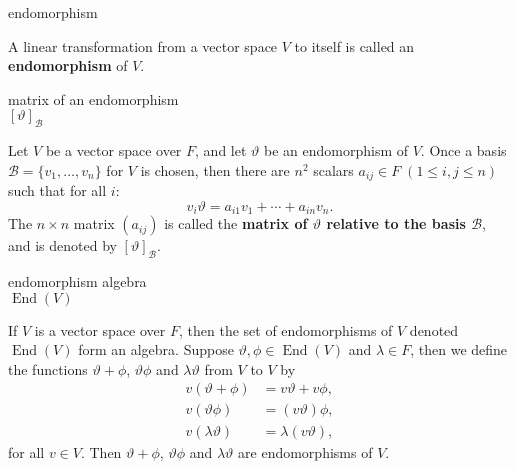 \documentclass[avery5371,grid]{flashcards}
\newcommand{\B}{\mathscr{B}}
\renewcommand{\le}{\leqslant}
\renewcommand{\theta}{\vartheta}
\DeclareMathOperator{\End}{\ensuremath{\textrm{End}}}
\newcommand{\defn}[1]{\textbf{#1}}
\begin{document}
\begin{flashcard}[Definition]{endomorphism}

  A linear transformation from a vector space $V$ to itself is called
  an \defn{endomorphism} of $V$.

\end{flashcard}


\begin{flashcard}[Definition 2.17]{matrix of an endomorphism \\ $[\theta ]_{\B}$}

  Let $V$ be a vector space over $F$, and let $\theta$ be an
  endomorphism of $V$. Once a basis $\B = \{ v_1, \ldots, v_n \}$ for
  $V$ is chosen, then there are $n^2$ scalars
  $a_{ij} \in F \; (1 \le i,j \le n)$ such that for all $i$:
  \[
    v_i \theta = a_{i1}v_1 + \cdots + a_{in}v_n.
  \]
  The $n\times n$ matrix $(a_{ij})$ is called the \defn{matrix of
    $\theta$ relative to the basis $\B$}, and is denoted by
  $[\theta ]_{\B}$.

\end{flashcard}

\begin{flashcard}[Definition]{endomorphism algebra \\$\End(V)$}

  If $V$ is a vector space over $F$, then the set of endomorphisms of
  $V$ denoted $\End(V)$ form an algebra. Suppose
  $\theta, \phi \in \End(V)$ and $\lambda \in F$, then we
  define the functions $\theta + \phi$, $\theta \phi$ and
  $\lambda \theta$ from $V$ to $V$ by
  \begin{align*}
    v(\theta + \phi) &= v\theta + v\phi, \\
    v(\theta \phi) &= (v \theta) \phi, \\
    v(\lambda \theta) &= \lambda (v \theta),
  \end{align*}
  for all $v \in V$. Then $\theta + \phi$, $\theta \phi$ and
  $\lambda \theta$ are endomorphisms of $V$.

\end{flashcard}
\end{document}
